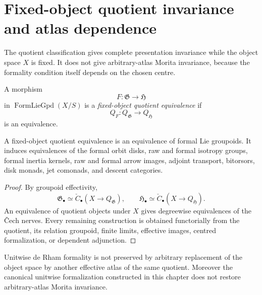 \section{Fixed-object quotient invariance and atlas dependence}
\label{sec:flg-presentation-invariance}

The quotient classification gives complete presentation invariance while the
object space $X$ is fixed.  It does not give arbitrary-atlas Morita
invariance, because the formality condition itself depends on the chosen
centre.

\begin{definition}
\label{def:quotient-equivalence}
A morphism
\[
    F:\mathfrak G\to\mathfrak H
\]
in $\operatorname{FormLieGpd}(X/S)$ is a
\emph{fixed-object quotient equivalence} if
\[
    Q_F:
    Q_{\mathfrak G}\longrightarrow Q_{\mathfrak H}
\]
is an equivalence.
\end{definition}

\begin{proposition}
\label{prop:presentation-invariance}
A fixed-object quotient equivalence is an equivalence of formal Lie
groupoids.  It induces equivalences of the formal orbit disks, raw and formal
isotropy groups, formal inertia kernels, raw and formal arrow images, adjoint
transport, bitorsors, disk monads, jet comonads, and descent categories.
\end{proposition}

\begin{proof}
By groupoid effectivity,
\[
    \mathfrak G_\bullet
    \simeq
    \check C_\bullet(X\to Q_{\mathfrak G}),
    \qquad
    \mathfrak H_\bullet
    \simeq
    \check C_\bullet(X\to Q_{\mathfrak H}).
\]
An equivalence of quotient objects under $X$ gives degreewise equivalences of
the \v{C}ech nerves.  Every remaining construction is obtained functorially from
the quotient, its relation groupoid, finite limits, effective images, centred
formalization, or dependent adjunction.
\end{proof}

\begin{proposition}
\label{prop:formality-not-morita-invariant}
Unitwise de Rham formality is not preserved by arbitrary
replacement of the object space by another effective atlas of the same
quotient.  Moreover the canonical unitwise formalization constructed in this
chapter does not restore arbitrary-atlas Morita invariance.
\end{proposition}

